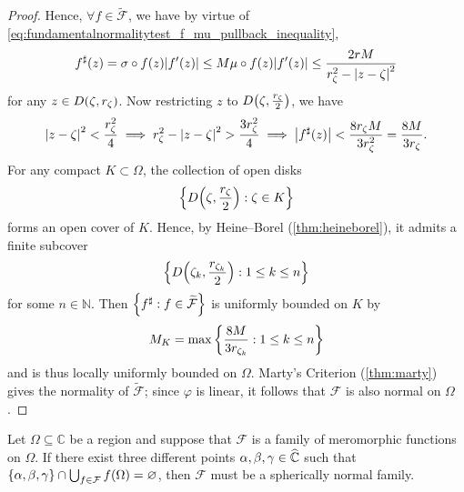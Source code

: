 \begin{proof}
    Hence, \(\forall f\in\widetilde{\mathcal{F}}\), we have by virtue of \cref{eq:fundamentalnormalitytest_f_mu_pullback_inequality}, \[f^\sharp(z)=\sigma\circ f(z)\abs{f'(z)}\leq M\mu\circ f(z)\abs{f'(z)}\leq\frac{2rM}{r_\zeta^2-\abs{z-\zeta}^2}\] for any \(z\in D\qty(\zeta,r_\zeta)\). Now restricting \(z\) to \(D\qty(\zeta,\frac{r_\zeta}{2})\), we have \[\abs{z-\zeta}^2<\frac{r_\zeta^2}4\implies r_\zeta^2-\abs{z-\zeta}^2>\frac{3r_\zeta^2}4\implies\abs{f^\sharp(z)}<\frac{8r_\zeta M}{3r_\zeta^2}=\frac{8M}{3r_\zeta}.\]
    For any compact \(K\subset\Omega\), the collection of open disks \[\cbraces{D\qty(\zeta,\frac{r_\zeta}{2})}{\zeta\in K}\] forms an open cover of \(K\). Hence, by Heine--Borel (\cref{thm:heineborel}), it admits a finite subcover \[\cbraces{D\qty(\zeta_k,\frac{r_{\zeta_k}}{2})}{1\leq k\leq n}\] for some \(n\in\mathbb{N}\). Then \(\cbraces{f^\sharp}{f\in\widetilde{\mathcal{F}}}\) is uniformly bounded on \(K\) by \[M_K=\max\cbraces{\frac{8M}{3r_{\zeta_k}}}{1\leq k\leq n}\] and is thus locally uniformly bounded on \(\Omega\). Marty's Criterion (\cref{thm:marty}) gives the normality of \(\widetilde{\mathcal{F}}\); since \(\varphi\) is linear, it follows that \(\mathcal{F}\) is also normal on \(\Omega\).
\end{proof}
\begin{corollary}[name=\textsc{Montel--Carathéodory}]\label{cor:montelcaratheodory}
    Let \(\Omega\subseteq\mathbb{C}\) be a region and suppose that \(\mathcal{F}\) is a family of meromorphic functions on \(\Omega\). If there exist three different points \(\alpha,\beta,\gamma\in\widehat{\mathbb{C}}\) such that \(\cbraces{\alpha,\beta,\gamma}\cap\bigcup_{f\in\mathcal{F}}f(\Omega)=\varnothing\), then \(\mathcal{F}\) must be a spherically normal family.
\end{corollary}
